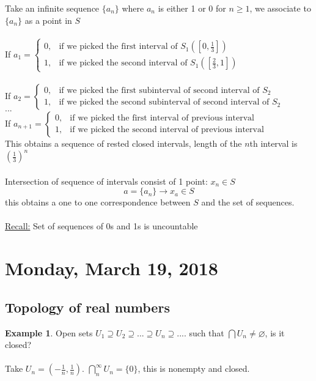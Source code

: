 \documentclass[12pt]{article}
\theoremstyle{plain}
\theoremstyle{definition}
\newtheorem{example}[theorem]{Example}
\begin{document}
Take an infinite sequence $\{ a_n \}$ where $a_n$ is either 1 or 0 for $n \geq 1$, we associate to $\{ a_n \}$ as a point in $S$\\
\\
If $a_1 = \begin{cases}
	0, &\text{if we picked the first interval of $S_1 ([0,\frac{1}{3}])$}\\
	1, &\text{if we picked the second interval of $S_1 ([\frac{2}{3},1])$}
\end{cases}$\\
\\
If $a_2 = \begin{cases}
	0, &\text{if we picked the first subinterval of second interval of $S_2$}\\
	1, &\text{if we picked the second subinterval of second interval of $S_2$}
\end{cases}$
\\
$...$
\\
If $a_{n+1} = \begin{cases}
	0, &\text{if we picked the first interval of previous interval}\\
	1, &\text{if we picked the second interval of previous interval}
\end{cases}$
\\
This obtains a sequence of rested closed intervals, length of the $n$th interval is $(\frac{1}{3})^n$\\
\\
Intersection of sequence of intervals consist of 1 point: $x_n \in S$
$$a = \{ a_n \} \to x_a \in S$$
this obtains a one to one correspondence between $S$ and the set of sequences.\\
\\
\underline{Recall:} Set of sequences of 0s and 1s is uncountable

\newpage

\section{Monday, March 19, 2018}

\subsection{Topology of real numbers}

\begin{example}
	Open sets $U_1 \supseteq U_2 \supseteq ... \supseteq U_n \supseteq ....$ such that $\bigcap U_n \neq \varnothing$, is it closed?\\
	\\
	Take $U_n = (-\frac{1}{n}, \frac{1}{n})$. $\bigcap^\infty_{n} U_n = \{ 0 \}$, this is nonempty and closed.\\
\end{example}
\end{document}
